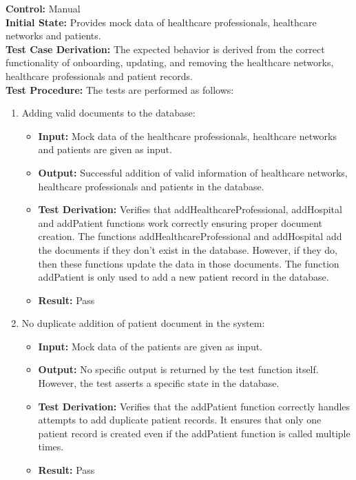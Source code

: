 \documentclass[12pt, titlepage]{article}
\begin{document}
  \textbf{Control:} Manual\\
  \textbf{Initial State:} Provides mock data of healthcare professionals, healthcare networks and patients.\\
  \textbf{Test Case Derivation:} The expected behavior is derived from the correct functionality of onboarding, updating, and removing the healthcare networks, healthcare professionals and patient records.\\
  \textbf{Test Procedure:} The tests are performed as follows:
  \begin{enumerate}
    \item Adding valid documents to the database:
      \begin{itemize}
        \item \textbf{Input:} Mock data of the healthcare professionals, healthcare networks and patients are given as input.  
        \item \textbf{Output:} Successful addition of valid information of healthcare networks, healthcare professionals and patients in the database. 
        \item \textbf{Test Derivation:} Verifies that addHealthcareProfessional, addHospital and addPatient functions work correctly ensuring proper document creation. The functions addHealthcareProfessional and addHospital add the documents if they don't exist in the database. However, if they do, then these functions update the data in those documents. The function addPatient is only used to add a new patient record in the database.
        \item \textbf{Result:} Pass 
      \end{itemize}

    \item No duplicate addition of patient document in the system:
      \begin{itemize}
        \item \textbf{Input:} Mock data of the patients are given as input.  
        \item \textbf{Output:} No specific output is returned by the test function itself. However, the test asserts a specific state in the database. 
        \item \textbf{Test Derivation:} Verifies that the addPatient function correctly handles attempts to add duplicate patient records. It ensures that only one patient record is created even if the addPatient function is called multiple times.
        \item \textbf{Result:} Pass
      \end{itemize}


\end{enumerate}
\end{document}
